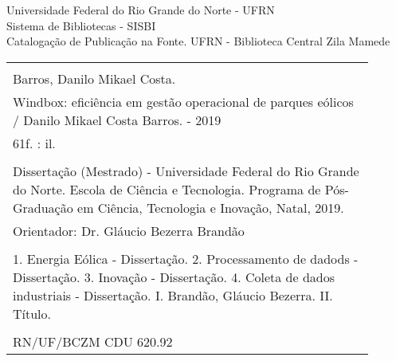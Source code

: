 %
%

\newpage

\begin{center}

\vspace*{\fill}


Universidade Federal do Rio Grande do Norte - UFRN\\[1ex]
Sistema de Bibliotecas - SISBI\\[1ex]
Catalogação de Publicação na Fonte. UFRN - Biblioteca Central Zila Mamede

\vspace{2ex}

\begin{tabular}{|p{0.9\linewidth}|} \hline
\\
Barros, Danilo Mikael Costa.\\
\hspace{1em} Windbox: eficiência em gestão operacional de parques eólicos /
Danilo Mikael Costa Barros. - 2019 \\
\hspace{1em} 61f. : il. \\
\\
\hspace{1em} Dissertação (Mestrado) - Universidade Federal do Rio Grande do Norte.
Escola de Ciência e Tecnologia. Programa de Pós-Graduação em Ciência, Tecnologia e Inovação, Natal, 2019. \\
\hspace{1em} Orientador: Dr. Gláucio Bezerra Brandão \\
\\
\hspace{1em} 1. Energia Eólica - Dissertação. 2. Processamento de dadods - Dissertação. 3. Inovação - Dissertação. 4. Coleta de dados industriais - Dissertação. I. Brandão, Gláucio Bezerra. II. Título. \\
\\
RN/UF/BCZM \hfill CDU 620.92 \\ \hline
\end{tabular} 

\end{center}
